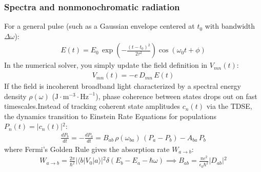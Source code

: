 \documentclass[letterpaper,10pt,english]{jupyterBook}
\begin{document}
\subsubsection{Spectra and non\sphinxhyphen{}monochromatic radiation}
\label{\detokenize{ch/quantum-mechanics/history/matrix-mechanics/electron-perturbation-numerical:spectra-and-non-monochromatic-radiation}}\label{\detokenize{ch/quantum-mechanics/history/matrix-mechanics/electron-perturbation-numerical:quantum-mechanics-electron-perturbation-numerical-simulation-spectra-and-non-monochromatic-radiation}}
\sphinxAtStartPar
{} For a general pulse (such as a Gaussian envelope centered at \(t_0\) with bandwidth \(\Delta \omega\)):
\begin{equation*}
\begin{split}E(t) = E_0 \, \exp\left( -\frac{(t - t_0)^2}{2 \tau^2} \right) \cos(\omega_0 t + \phi)\end{split}
\end{equation*}
\sphinxAtStartPar
In the numerical solver, you simply update the field definition in \(V_{mn}(t)\):
\begin{equation*}
\begin{split}V_{mn}(t) = -e \, D_{mn} \, E(t)\end{split}
\end{equation*}
\sphinxAtStartPar
{} If the field is incoherent broadband light characterized by a spectral energy density \(\rho(\omega)\) (\(\text{J}\cdot\text{m}^{-3}\cdot\text{Hz}^{-1}\)), phase coherence between states drops out on fast timescales.Instead of tracking coherent state amplitudes \(c_n(t)\) via the TDSE, the dynamics transition to Einstein Rate Equations for populations \(P_n(t) = \vert{}c_n(t)\vert{}^2\):
\begin{equation*}
\begin{split}\frac{d P_b}{dt} = -\frac{d P_a}{dt} = B_{ab} \, \rho(\omega_{ba}) \, (P_a - P_b) - A_{ba} \, P_b\end{split}
\end{equation*}
\sphinxAtStartPar
where Fermi’s Golden Rule gives the absorption rate \(W_{a \to b}\):
\begin{equation*}
\begin{split}W_{a \to b} = \frac{2\pi}{\hbar^2} \vert{}\langle b \vert{} V_0 \vert{} a \rangle\vert{}^2 \delta(E_b - E_a - \hbar\omega) \implies B_{ab} = \frac{\pi e^2}{\epsilon_0 \hbar^2} \vert{}D_{ab}\vert{}^2\end{split}
\end{equation*}
\end{document}
